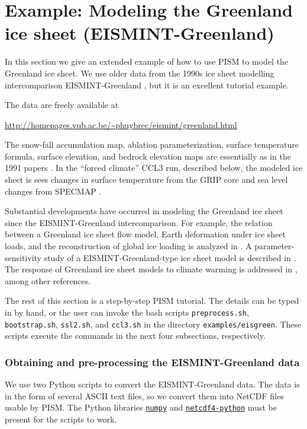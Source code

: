 
\section{Example: Modeling the Greenland ice sheet (EISMINT-Greenland)}\label{sec:eismint-greenland}  

In this section we give an extended example of how to use PISM to model the Greenland ice sheet.  We use older data from the 1990s ice sheet modelling intercomparison EISMINT-Greenland \cite{HuybrechtsEISMINT,RitzEISMINT}, but it is an excellent tutorial example.

The data are freely available at

\begin{center}
  \url{http://homepages.vub.ac.be/~phuybrec/eismint/greenland.html}
\end{center}

\noindent The snow-fall accumulation map, ablation parameterization, surface temperature formula, surface elevation, and bedrock elevation maps are essentially as in the 1991 papers \cite{Letreguillyetal1991,OhmuraReeh}.  In the ``forced climate'' CCL3 run, described below, the modeled ice sheet is sees changes in surface temperature from the GRIP core \cite{Dansgaardetal1993} and sea level changes from SPECMAP \cite{Imbrieetal1984}.

Substantial developments have occurred in modeling the Greenland ice sheet since the EISMINT-Greenland intercomparison.  For example, the relation between a Greenland ice sheet flow model, Earth deformation under ice sheet loads, and the reconstruction of global ice loading is analyzed in \cite{TarasovPeltier}.  A parameter-sensitivity study of a EISMINT-Greenland-type ice sheet model is described in \cite{RitzFabreLetreguilly}.  The response of Greenland ice sheet models to climate warming is addressed in \cite{HuybrechtsdeWolde,Huybrechts02, Greve00}, among other references.

The rest of this section is a step-by-step PISM tutorial.  The details can be typed in by hand, or the user can invoke the bash scripts \texttt{preprocess.sh}, \texttt{bootstrap.sh}, \texttt{ssl2.sh}, and \texttt{ccl3.sh} in the directory \texttt{examples/eisgreen}.  These scripts execute the commands in the next four subsections, respectively.

\subsubsection*{Obtaining and pre-processing the EISMINT-Greenland data}  We use two Python scripts to convert the EISMINT-Greenland data.  The data is in the form of several ASCII text files, so we convert them into NetCDF files usable by PISM.  The Python libraries \href{http://numpy.scipy.org/}{\texttt{numpy}} and \href{http://code.google.com/p/netcdf4-python/}{\texttt{netcdf4-python}} must be present for the scripts to work.

